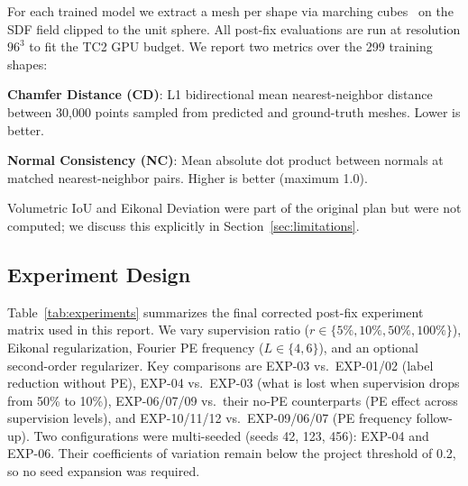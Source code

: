 \documentclass[conference]{IEEEtran}
\begin{document}
For each trained model we extract a mesh per shape via marching cubes~\cite{marchingcubes} on the SDF field clipped to the unit sphere. All post-fix evaluations are run at resolution $96^3$ to fit the TC2 GPU budget. We report two metrics over the 299 training shapes:

\textbf{Chamfer Distance (CD)}: L1 bidirectional mean nearest-neighbor distance between 30{,}000 points sampled from predicted and ground-truth meshes. Lower is better.

\textbf{Normal Consistency (NC)}: Mean absolute dot product between normals at matched nearest-neighbor pairs. Higher is better (maximum 1.0).

Volumetric IoU and Eikonal Deviation were part of the original plan but were not computed; we discuss this explicitly in Section~\ref{sec:limitations}.

\subsection{Experiment Design}

Table~\ref{tab:experiments} summarizes the final corrected post-fix experiment matrix used in this report. We vary supervision ratio ($r \in \{5\%, 10\%, 50\%, 100\%\}$), Eikonal regularization, Fourier PE frequency ($L \in \{4, 6\}$), and an optional second-order regularizer. Key comparisons are EXP-03 vs.\ EXP-01/02 (label reduction without PE), EXP-04 vs.\ EXP-03 (what is lost when supervision drops from 50\% to 10\%), EXP-06/07/09 vs.\ their no-PE counterparts (PE effect across supervision levels), and EXP-10/11/12 vs.\ EXP-09/06/07 (PE frequency follow-up). Two configurations were multi-seeded (seeds 42, 123, 456): EXP-04 and EXP-06. Their coefficients of variation remain below the project threshold of 0.2, so no seed expansion was required.
\end{document}

